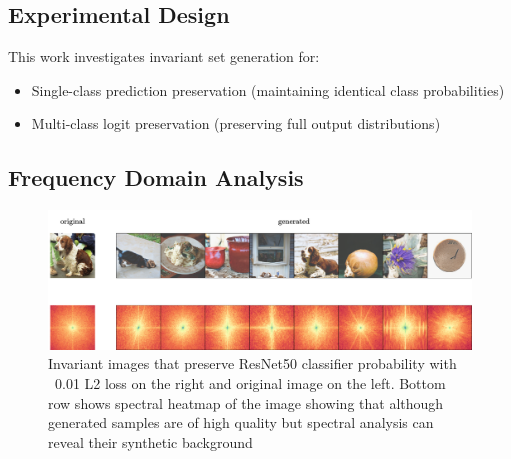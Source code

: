 \subsection{Experimental Design}

This work investigates invariant set generation for:
\begin{itemize}
\item Single-class prediction preservation (maintaining identical class probabilities)
\item Multi-class logit preservation (preserving full output distributions)  
\end{itemize}

\subsection{Frequency Domain Analysis}

\begin{figure}[h]
\centering
\includegraphics[width=\linewidth]{figures/main/spectral_analysis_1.png}
\caption{Invariant images that preserve ResNet50 classifier probability with ~0.01 L2 loss on the right and original image on the left. Bottom row shows spectral heatmap of the image showing that although generated samples are of high quality but spectral analysis can reveal their synthetic background}
\label{fig:frequency_analysis_1}
\end{figure}

